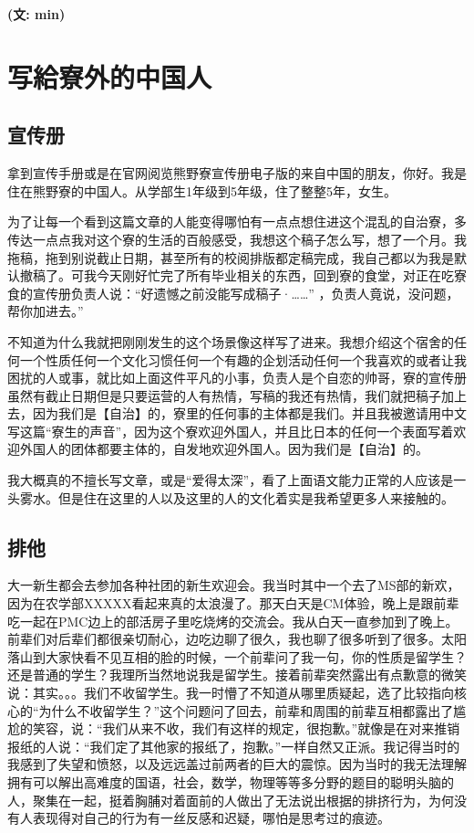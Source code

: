 \documentclass[10pt,b5jsbook,dvips,dvipdfmx,openany]{jsbook}
\theoremstyle{definition}
\begin{document}
{\bf (文: min)}

\newpage

  \section{写給寮外的中国人}

\subsection{宣传册}
拿到宣传手册或是在官网阅览熊野寮宣传册电子版的来自中国的朋友，你好。我是住在熊野寮的中国人。从学部生1年级到5年级，住了整整5年，女生。

为了让每一个看到这篇文章的人能变得哪怕有一点点想住进这个混乱的自治寮，多传达一点点我对这个寮的生活的百般感受，我想这个稿子怎么写，想了一个月。我拖稿，拖到别说截止日期，甚至所有的校阅排版都定稿完成，我自己都以为我是默认撤稿了。可我今天刚好忙完了所有毕业相关的东西，回到寮的食堂，对正在吃寮食的宣传册负责人说：“好遗憾之前没能写成稿子·……” ，负责人竟说，没问题，帮你加进去。”

不知道为什么我就把刚刚发生的这个场景像这样写了进来。我想介绍这个宿舍的任何一个性质任何一个文化习惯任何一个有趣的企划活动任何一个我喜欢的或者让我困扰的人或事，就比如上面这件平凡的小事，负责人是个自恋的帅哥，寮的宣传册虽然有截止日期但是只要运营的人有热情，写稿的我还有热情，我们就把稿子加上去，因为我们是【自治】的，寮里的任何事的主体都是我们。并且我被邀请用中文写这篇“寮生的声音”，因为这个寮欢迎外国人，并且比日本的任何一个表面写着欢迎外国人的团体都要主体的，自发地欢迎外国人。因为我们是【自治】的。

我大概真的不擅长写文章，或是“爱得太深”，看了上面语文能力正常的人应该是一头雾水。但是住在这里的人以及这里的人的文化着实是我希望更多人来接触的。

\subsection{排他}
大一新生都会去参加各种社团的新生欢迎会。我当时其中一个去了MS部的新欢，因为在农学部XXXXX看起来真的太浪漫了。那天白天是CM体验，晚上是跟前辈吃一起在PMC边上的部活房子里吃烧烤的交流会。我从白天一直参加到了晚上。前辈们对后辈们都很亲切耐心，边吃边聊了很久，我也聊了很多听到了很多。太阳落山到大家快看不见互相的脸的时候，一个前辈问了我一句，你的性质是留学生？还是普通的学生？我理所当然地说我是留学生。接着前辈突然露出有点歉意的微笑说：其实。。。我们不收留学生。我一时懵了不知道从哪里质疑起，选了比较指向核心的“为什么不收留学生？”这个问题问了回去，前辈和周围的前辈互相都露出了尴尬的笑容，说：“我们从来不收，我们有这样的规定，很抱歉。”就像是在对来推销报纸的人说：“我们定了其他家的报纸了，抱歉。”一样自然又正派。我记得当时的我感到了失望和愤怒，以及远远盖过前两者的巨大的震惊。因为当时的我无法理解拥有可以解出高难度的国语，社会，数学，物理等等多分野的题目的聪明头脑的人，聚集在一起，挺着胸脯对着面前的人做出了无法说出根据的排挤行为，为何没有人表现得对自己的行为有一丝反感和迟疑，哪怕是思考过的痕迹。
\end{document}
